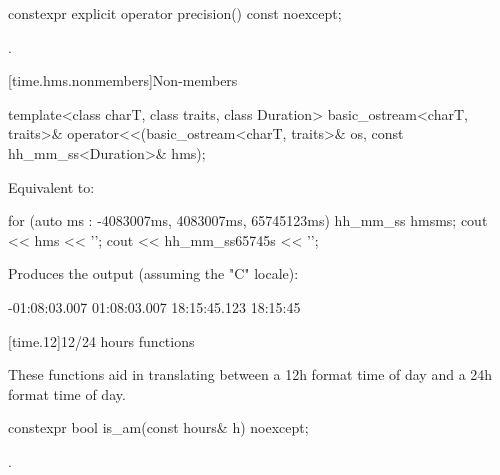 %
\begin{itemdecl}
constexpr explicit operator precision() const noexcept;
\end{itemdecl}

\begin{itemdescr}
\pnum
\returns
{}.
\end{itemdescr}

[time.hms.nonmembers]{Non-members}

\begin{itemdecl}
template<class charT, class traits, class Duration>
basic_ostream<charT, traits>&
operator<<(basic_ostream<charT, traits>& os, const hh_mm_ss<Duration>& hms);
\end{itemdecl}

\begin{itemdescr}
\pnum
\effects
Equivalent to:

\pnum
\begin{example}
\begin{codeblock}
for (auto ms : {-4083007ms, 4083007ms, 65745123ms}) {
  hh_mm_ss hms{ms};
  cout << hms << '\n';
}
cout << hh_mm_ss{65745s} << '\n';
\end{codeblock}
Produces the output (assuming the "C" locale):
\begin{codeblock}
-01:08:03.007
01:08:03.007
18:15:45.123
18:15:45
\end{codeblock}
\end{example}
\end{itemdescr}

[time.12]{12/24 hours functions}

\pnum
These functions aid in translating between a 12h format time of day
and a 24h format time of day.

%
\begin{itemdecl}
constexpr bool is_am(const hours& h) noexcept;
\end{itemdecl}

\begin{itemdescr}
\pnum
\returns
{}.
\end{itemdescr}

